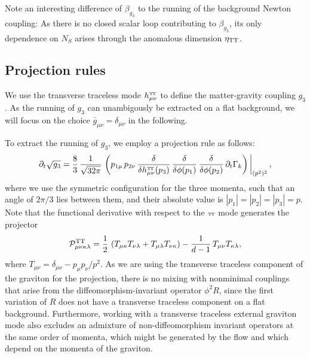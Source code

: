 \documentclass[11pt]{book} %
\newcommand\TTspace{ -1pt }
\newcommand\TT{ \scriptscriptstyle{\mathrm{T\hspace{\TTspace}T}} }
\newcommand\hTTmunu{ h^{\scriptscriptstyle{\mathrm{T\hspace{\TTspace}T}}}_{\mu\nu} }
\numberwithin{equation}{chapter}
\begin{document}
Note an interesting difference of $\beta_{g_3}$ to the running of the background Newton coupling:
As there is no closed scalar loop contributing to $\beta_{g_3}$,
its only dependence on $N_S$ arises through the anomalous dimension $\eta_{\rm TT}$.

%
\subsection{Projection rules}

We use the transverse traceless mode $\hTTmunu$
to define the matter-gravity coupling $g_3$.
As the running of $g_3$ can unambigously be extracted on a flat background,
we will focus on the choice $\bar{g}_{\mu \nu} = \delta_{\mu \nu}$ in the following.

To extract the running of $g_3$, we employ a projection rule as follows:
\begin{align}
  \partial_t \sqrt{g_3} = \frac{8}{3} \, \frac{1}{\sqrt{32 \pi}} \,
  \left(
    p_{1\mu} \, p_{2\nu}  \,
    \frac{\delta}{\delta \hTTmunu(p_3)} \, \frac{\delta}{\delta\phi(p_1)} \, \frac{\delta}{\delta\phi(p_2)} \,
    \partial_t \Gamma_k
  \right) \bigg|_{(p^2)^2} \,,
  \label{projectiong3}
\end{align}
where we use the symmetric configuration for the three momenta,
such that an angle of $2\pi/3$ lies between them, and their absolute value is $|p_1| = |p_2|=|p_3| =p$.
Note that the functional derivative with respect to the $\TT$ mode generates the projector
\begin{align}
  \mathcal{P}^{\rm TT}_{\mu\nu\kappa\lambda} = \frac{1}{2} \,
  \left(
    T_{\mu
    \kappa}T_{\nu \lambda}
    + T_{\mu\lambda}T_{\nu \kappa}
  \right)
  - \frac{1}{d-1} \, T_{\mu\nu}T_{\kappa\lambda},
  \label{projector}
\end{align}
where $T_{\mu \nu}=\delta_{\mu\nu}-p_{\mu}p_{\nu}/p^2$.
As we are using the transverse traceless component of the graviton for the projection,
there is no mixing with nonminimal couplings that arise from the diffeomorphism-invariant
operator $\phi^2 R$, since the first variation of $R$ does not have a transverse traceless
component  on a flat background.
Furthermore, working with a transverse traceless external graviton mode also excludes an admixture
of non-diffeomorphism invariant operators at the same order of momenta,
which might be generated by the flow and which depend on the momenta of the graviton.
\end{document}
